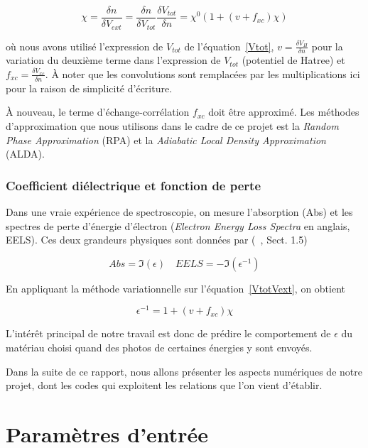 \documentclass[12pt, french]{report}
\theoremstyle{theoreme}
\begin{document}
\begin{equation}\label{chi0chi}
\chi = \frac{\delta n}{\delta V_{ext}} = \frac{\delta n}{\delta V_{tot}} \frac{\delta V_{tot}}{\delta n} = \chi^0 ( 1 + (v+f_{xc})\chi)
\end{equation}

où nous avons utilisé l'expression de $V_{tot}$ de l'équation~\ref{Vtot}, $v = \frac{\delta V_H}{\delta n}$ pour la variation du deuxième terme dans l'expression de $V_{tot}$ (potentiel de Hatree) et $f_{xc} = \frac{\delta V_{xc}}{\delta n}$. À noter que les convolutions sont remplacées par les multiplications ici pour la raison de simplicité d'écriture.

À nouveau, le terme d'échange-corrélation $f_{xc}$ doit être approximé. Les méthodes d'approximation que nous utilisons dans le cadre de ce projet est la \textit{Random Phase Approximation} (RPA) et la \textit{Adiabatic Local Density Approximation} (ALDA).

\subsection{Coefficient diélectrique et fonction de perte}
Dans une vraie expérience de spectroscopie, on mesure l'absorption (Abs) et les spectres de perte d'énergie d'électron (\textit{Electron Energy Loss Spectra} en anglais, EELS). Ces deux grandeurs physiques sont données par (~\cite{Sot03}, Sect. 1.5)

$$
Abs = \mathfrak{I}(\epsilon) \quad EELS = -\mathfrak{I}(\epsilon^{-1})
$$

En appliquant la méthode variationnelle sur l'équation~\ref{VtotVext}, on obtient

\begin{equation}\label{epsilon}
  \epsilon^{-1} = 1+ (v + f_{xc})\chi
\end{equation}

L'intérêt principal de notre travail est donc de prédire le comportement de $\epsilon$ du matériau choisi quand des photos de certaines énergies y sont envoyés.

Dans la suite de ce rapport, nous allons présenter les aspects numériques de notre projet, dont les codes qui exploitent les relations que l'on vient d'établir.



\appendix
\chapter{Paramètres d'entrée}
\end{document}
